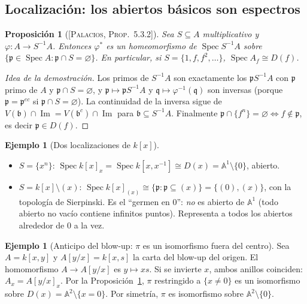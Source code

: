 \documentclass[11pt,a4paper]{article}
\newcommand{\Spec}{\operatorname{Spec}}
\newcommand{\A}{\mathbb{A}}
\newcommand{\pp}{\mathfrak{p}}
\newcommand{\qq}{\mathfrak{q}}
\newcommand{\bbb}{\mathfrak{b}}
\theoremstyle{plain}
\newtheorem{proposicion}[teorema]{Proposición}
\theoremstyle{definition}
\newtheorem{ejemplo}[teorema]{Ejemplo}
\theoremstyle{remark}
\newcounter{ej}
\newcommand{\libro}[1]{\textsc{[Palacios, #1]}}
\begin{document}
\subsection{Localización: los abiertos básicos son espectros}

\begin{proposicion}[{\libro{Prop.~5.3.2}}]\label{prop:loc}
Sea $S\subseteq A$ multiplicativo y $\varphi:A\to S^{-1}A$. Entonces $\varphi^*$ es un homeomorfismo de $\Spec S^{-1}A$ sobre $\{\pp\in\Spec A:\pp\cap S=\varnothing\}$. En particular, si $S=\{1,f,f^2,\dots\}$, $\Spec A_f\cong D(f)$.
\end{proposicion}
\begin{proof}[Idea de la demostración]
Los primos de $S^{-1}A$ son exactamente los $\pp S^{-1}A$ con $\pp$ primo de $A$ y $\pp\cap S=\varnothing$, y $\pp\mapsto\pp S^{-1}A$ y $\qq\mapsto\varphi^{-1}(\qq)$ son inversas (porque $\pp=\pp^{ec}$ si $\pp\cap S=\varnothing$). La continuidad de la inversa sigue de $V(\bbb)\cap\operatorname{Im}=V(\bbb^c)\cap\operatorname{Im}$ para $\bbb\subseteq S^{-1}A$. Finalmente $\pp\cap\{f^n\}=\varnothing\iff f\notin\pp$, es decir $\pp\in D(f)$.
\end{proof}

\begin{ejemplo}[{Dos localizaciones de $k[x]$}]\label{ej:loc}
\begin{itemize}[itemsep=1pt]
\item $S=\{x^n\}$: $\Spec k[x]_x=\Spec k[x,x^{-1}]\cong D(x)=\A^1\setminus\{0\}$, abierto.
\item $S=k[x]\setminus(x)$: $\Spec k[x]_{(x)}\cong\{\pp:\pp\subseteq(x)\}=\{(0),(x)\}$, con la topología de Sierpinski. Es el ``germen en $0$'': \emph{no} es abierto de $\A^1$ (todo abierto no vacío contiene infinitos puntos). Representa a todos los abiertos alrededor de $0$ a la vez.
\end{itemize}
\end{ejemplo}

\begin{ejemplo}[{Anticipo del blow-up: $\pi$ es un isomorfismo fuera del centro}]\label{ej:antic}
Sea $A=k[x,y]$ y $A[y/x]=k[x,s]$ la carta del blow-up del origen. El homomorfismo $A\to A[y/x]$ es $y\mapsto xs$. Si se invierte $x$, ambos anillos coinciden: $A_x=A[y/x]_x$. Por la Proposición~\ref{prop:loc}, $\pi$ restringido a $\{x\ne0\}$ es un isomorfismo sobre $D(x)=\A^2\setminus\{x=0\}$. Por simetría, $\pi$ es isomorfismo sobre $\A^2\setminus\{0\}$.
\end{ejemplo}
\end{document}
